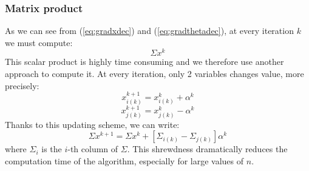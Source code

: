 \subsubsection{Matrix product}
As we can see from (\ref{eq:gradxdec}) and (\ref{eq:gradthetadec}), at every iteration $k$ we must compute:
\begin{equation}
\Sigma  x^{k}
\end{equation}
This scalar product is highly time consuming and we therefore use another approach to compute it. At every iteration, only 2 variables changes value, more precisely:
\begin{equation}
x_{i(k)}^{k+1} = x_{i(k)}^{k} + \alpha^{k}
\end{equation}
\begin{equation}
x_{j(k)}^{k+1} = x_{j(k)}^{k} - \alpha^{k}
\end{equation}
Thanks to this updating scheme, we can write:
\begin{equation}
\Sigma x^{k+1} = \Sigma  x^{k} + \left[\Sigma_{i(k)} - \Sigma_{j(k)}\right]\alpha^{k} 
\end{equation}
where $\Sigma_{i}$ is the $i$-th column of $\Sigma$. This shrewdness dramatically reduces the computation time of the algorithm, especially for large values of $n$.

